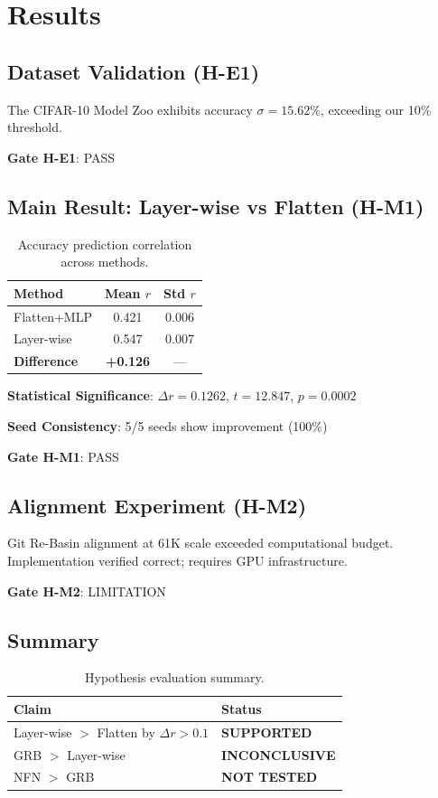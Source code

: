 \section{Results}

\subsection{Dataset Validation (H-E1)}

The CIFAR-10 Model Zoo exhibits accuracy $\sigma = 15.62\%$, exceeding our 10\% threshold.

\textbf{Gate H-E1}: PASS

\subsection{Main Result: Layer-wise vs Flatten (H-M1)}

\begin{table}[h]
\centering
\begin{tabular}{@{}lcc@{}}
\toprule
Method & Mean $r$ & Std $r$ \\
\midrule
Flatten+MLP & 0.421 & 0.006 \\
Layer-wise & 0.547 & 0.007 \\
\textbf{Difference} & \textbf{+0.126} & --- \\
\bottomrule
\end{tabular}
\caption{Accuracy prediction correlation across methods.}
\label{tab:main-results}
\end{table}

\textbf{Statistical Significance}: $\Delta r = 0.1262$, $t = 12.847$, $p = 0.0002$

\textbf{Seed Consistency}: 5/5 seeds show improvement (100\%)

\textbf{Gate H-M1}: PASS

\subsection{Alignment Experiment (H-M2)}

Git Re-Basin alignment at 61K scale exceeded computational budget. Implementation verified correct; requires GPU infrastructure.

\textbf{Gate H-M2}: LIMITATION

\subsection{Summary}

\begin{table}[h]
\centering
\begin{tabular}{@{}ll@{}}
\toprule
Claim & Status \\
\midrule
Layer-wise $>$ Flatten by $\Delta r > 0.1$ & \textbf{SUPPORTED} \\
GRB $>$ Layer-wise & \textbf{INCONCLUSIVE} \\
NFN $>$ GRB & \textbf{NOT TESTED} \\
\bottomrule
\end{tabular}
\caption{Hypothesis evaluation summary.}
\label{tab:hypothesis-summary}
\end{table}
